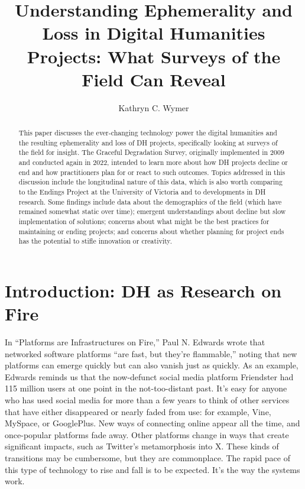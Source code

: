 \documentclass[final]{anthology-ch}
\title{Understanding Ephemerality and Loss in Digital Humanities Projects: What Surveys of the Field Can Reveal}
\author[1]{Kathryn C. Wymer}[
  orcid=0000-0003-0100-2692
]
\affiliation{1}{University of North Carolina at Chapel Hill, Chapel Hill, NC, USA}
\begin{document}
\maketitle

\nocite{arneil2023planning,otis2023follow}

\begin{abstract}
This paper discusses the ever-changing technology power the digital humanities and the resulting ephemerality and loss of DH projects, specifically looking at surveys of the field for insight. The Graceful Degradation Survey, originally implemented in 2009 and conducted again in 2022, intended to learn more about how DH projects decline or end and how practitioners plan for or react to such outcomes. Topics addressed in this discussion include the longitudinal nature of this data, which is also worth comparing to the Endings Project at the University of Victoria and to developments in DH research. Some findings include data about the demographics of the field (which have remained somewhat static over time); emergent understandings about decline but slow implementation of solutions; concerns about what might be the best practices for maintaining or ending projects; and concerns about whether planning for project ends has the potential to stifle innovation or creativity.
\end{abstract}

\section{Introduction: DH as Research on Fire} \label{sec:intro}

In \enquote{Platforms are Infrastructures on Fire,} Paul N. Edwards \cite[p.~313]{edwards2021platforms} wrote that networked software platforms \enquote{are fast, but they're flammable,} noting that new platforms can emerge quickly but can also vanish just as quickly. As an example, Edwards reminds us that the now-defunct social media platform Friendster had 115 million users at one point in the not-too-distant past. It's easy for anyone who has used social media for more than a few years to think of other services that have either disappeared or nearly faded from use: for example, Vine, MySpace, or GooglePlus. New ways of connecting online appear all the time, and once-popular platforms fade away. Other platforms change in ways that create significant impacts, such as Twitter's metamorphosis into X. These kinds of transitions may be cumbersome, but they are commonplace. The rapid pace of this type of technology to rise and fall is to be expected. It's the way the systems work.
\end{document}
